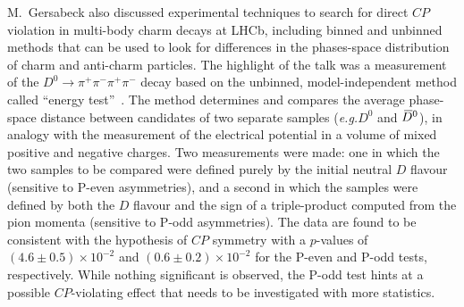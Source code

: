 \documentclass{PoS}
\newcommand{\CP}{{\ensuremath{C\!P}}\xspace}
\newcommand{\Dz}{\ensuremath{D^0}\xspace}
\def\Dbar{{\kern 0.2em\overline{\kern -0.2em\ensuremath{D}}{}}\xspace}
\newcommand{\Dzb}{\ensuremath{\Dbar{}^0}\xspace}
\newcommand{\eg}{\mbox{\itshape e.g.}\xspace}
\begin{document}
M.~Gersabeck also discussed experimental techniques to search for direct \CP violation in multi-body charm decays at LHCb, including binned and unbinned methods that can be used to look for differences in the phases-space distribution of charm and anti-charm particles. The highlight of the talk was a measurement of the $D^0\to\pi^+\pi^-\pi^+\pi^-$ decay based on the unbinned, model-independent method called  ``energy test''~\cite{LHCb-PAPER-2016-044}. The method determines and compares the average phase-space distance between candidates of two separate samples (\eg \Dz and \Dzb), in analogy with the measurement of the electrical potential in a volume of mixed positive and negative charges. Two measurements were made: one in which the two samples to be compared were defined purely by the initial neutral $D$ flavour (sensitive to P-even asymmetries), and a second in which the samples were defined by both the $D$ flavour and the sign of a triple-product computed from the pion momenta (sensitive to P-odd asymmetries). The data are found to be consistent with the hypothesis of \CP symmetry with a $p$-values of $(4.6\pm0.5)\times10^{-2}$ and $(0.6\pm0.2)\times10^{-2}$ for the P-even and P-odd tests, respectively. While nothing significant is observed, the P-odd test hints at a possible \CP-violating effect that needs to be investigated with more statistics.
\end{document}
